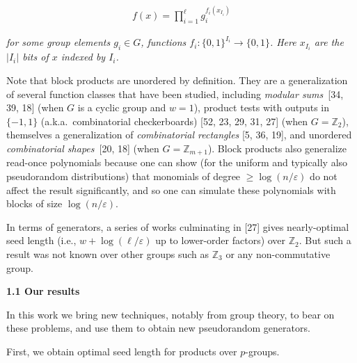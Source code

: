 \documentclass[10pt,a4paper]{article}
\begin{document}
\[\begin{gathered}
f(x)=\prod_{i=1}^{\ell}g_{i}^{f_{i}(x_{I_{i}})}
\end{gathered}\]


\emph{for some group elements $g_{i}\in G$, functions $f_{i}\colon\{0,1\}^{I_{i}}\to\{0,1\}$.
Here $x_{I_{i}}$ are the $|I_{i}|$ bits of $x$ indexed by $I_{i}$.}\par






Note that block products are unordered by definition. They are a generalization
of several function classes that have been studied, including \emph{modular
sums} [34, 39, 18] (when $G$ is a cyclic group and
$w=1$), product tests with outputs in $\{-1,1\}$ (a.k.a. combinatorial
checkerboards) [52, 23, 29, 31, 27] (when $G=\mathbb{Z}_{2}$),
themselves a generalization of \emph{combinatorial rectangles }[5, 36, 19],
and unordered \emph{combinatorial shapes} [20, 18] (when
$G=\mathbb{Z}_{m+1}$). Block products also generalize read-once polynomials
because one can show (for the uniform and typically also pseudorandom
distributions) that monomials of degree $\geq\log(n/\varepsilon)$ do not affect
the result significantly, and so one can simulate these polynomials
with blocks of size $\log(n/\varepsilon)$.\par




In terms of generators, a series of works culminating in [27]
gives nearly-optimal seed length (i.e., $w+\log(\ell/\varepsilon)$ up to lower-order
factors) over $\mathbb{Z}_{2}$. But such a result was not known over other groups such as $\mathbb{Z}_{3}$ or any non-commutative group.\par





\par\medskip\noindent\textbf{
1.1 Our results}\par




In this work we bring new techniques, notably from group theory, to
bear on these problems, and use them to obtain new pseudorandom generators.\par




First, we obtain optimal seed length for products over $p$-groups.\par
\end{document}
